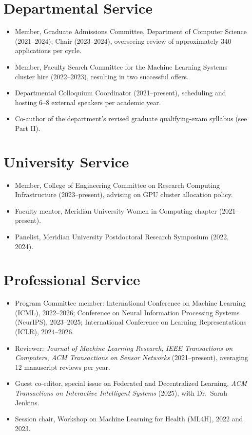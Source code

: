 
\section{Departmental Service}
\begin{itemize}
  \item Member, Graduate Admissions Committee, Department of Computer Science (2021--2024); Chair (2023--2024), overseeing review of approximately 340 applications per cycle.
  \item Member, Faculty Search Committee for the Machine Learning Systems cluster hire (2022--2023), resulting in two successful offers.
  \item Departmental Colloquium Coordinator (2021--present), scheduling and hosting 6--8 external speakers per academic year.
  \item Co-author of the department's revised graduate qualifying-exam syllabus (see Part II).
\end{itemize}

\section{University Service}
\begin{itemize}
  \item Member, College of Engineering Committee on Research Computing Infrastructure (2023--present), advising on GPU cluster allocation policy.
  \item Faculty mentor, Meridian University Women in Computing chapter (2021--present).
  \item Panelist, Meridian University Postdoctoral Research Symposium (2022, 2024).
\end{itemize}

\section{Professional Service}
\begin{itemize}
  \item Program Committee member: International Conference on Machine Learning (ICML), 2022--2026; Conference on Neural Information Processing Systems (NeurIPS), 2023--2025; International Conference on Learning Representations (ICLR), 2024--2026.
  \item Reviewer: \emph{Journal of Machine Learning Research}, \emph{IEEE Transactions on Computers}, \emph{ACM Transactions on Sensor Networks} (2021--present), averaging 12 manuscript reviews per year.
  \item Guest co-editor, special issue on Federated and Decentralized Learning, \emph{ACM Transactions on Interactive Intelligent Systems} (2025), with Dr.\ Sarah Jenkins.
  \item Session chair, Workshop on Machine Learning for Health (ML4H), 2022 and 2023.
\end{itemize}

